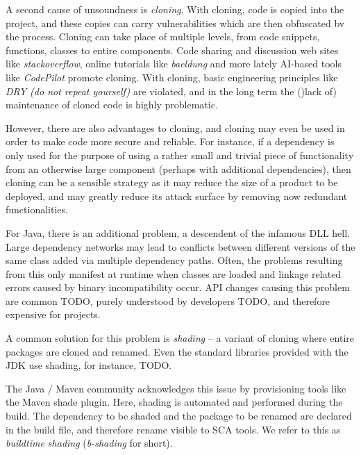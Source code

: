 \documentclass{article}
\begin{document}
 
 A second cause of unsoundness is \textit{cloning}. With cloning, code is copied into the project, and these copies can carry vulnerabilities which are then obfuscated bv the process. Cloning can take place of multiple levels, from code snippets, functions, classes to entire components.  Code sharing and discussion web sites like \textit{stackoverflow}, online tutorials like \textit{baeldung} and more lately AI-based tools like \textit{CodePilot} promote cloning.  With cloning, basic engineering principles like \textit{DRY (do not repeat yourself)} are violated, and in the long term the ()lack of) maintenance of cloned code is highly problematic. 
 
 However, there are also advantages to cloning, and cloning may even be used in order to make code more secure and reliable. For instance, if a dependency is only used for the purpose of using  a rather small and trivial piece of functionality from an otherwise large component (perhaps with additional dependencies), then cloning can be a sensible strategy as it may reduce the size of a product to be deployed, and may greatly reduce its attack surface by removing now redundant functionalities. 
 
 For Java, there is an additional problem, a descendent of the infamous DLL hell. Large dependency networks may lead to conflicts between different versions of the same class added via multiple dependency paths. Often, the problems resulting from this only manifest at runtime when classes are loaded and linkage related errors caused by binary incompatibility occur. API changes causing this problem are common TODO,  purely understood by developers TODO, and therefore expensive for projects. 
 
 A common solution for this problem is \textit{shading} -- a variant of cloning where entire packages are cloned and renamed. Even the standard libraries provided with the JDK use shading, for instance, TODO. 
 
 The Java / Maven community acknowledges this issue by provisioning tools like the Maven shade plugin. Here, shading is automated and performed during the build. The dependency to be shaded and the package to be renamed are declared in the build file, and therefore rename visible to SCA tools. We refer to this as \textit{buildtime shading} (\textit{b-shading} for short). 
 
\end{document}
